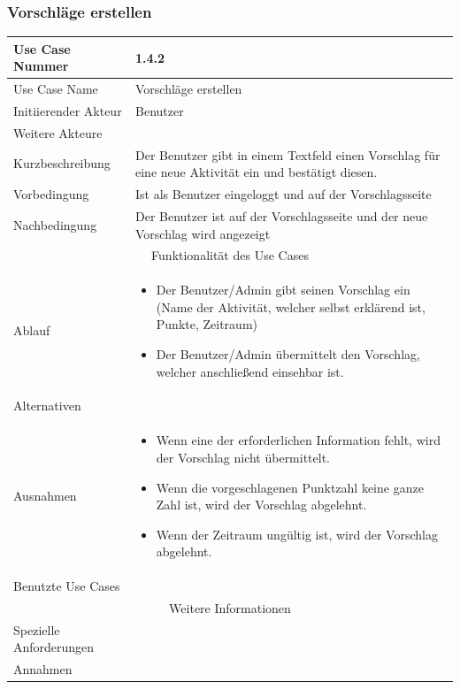 \documentclass[10pt,a4paper]{article}
\begin{document}
	\subsubsection{Vorschl\"age erstellen}
	\begin{tabular}{|l|p{.5\linewidth}|}
		\hline Use Case Nummer & 1.4.2 \\ 
		\hline Use Case Name & Vorschl\"age erstellen \\ 
		\hline Initiierender Akteur & Benutzer \\
		\hline Weitere Akteure & \\
		\hline Kurzbeschreibung & Der Benutzer gibt in einem Textfeld einen Vorschlag für eine neue Aktivit\"at ein und bestätigt diesen. \\
		\hline Vorbedingung & Ist als Benutzer eingeloggt und auf der Vorschlagsseite \\
		\hline Nachbedingung & Der Benutzer ist auf der Vorschlagsseite und der neue Vorschlag wird angezeigt \\
		\hline \multicolumn{2}{|c|}{Funktionalität des Use Cases}\\
		\hline Ablauf & \begin{itemize}
			\item Der Benutzer/Admin gibt seinen Vorschlag ein (Name der Aktivität, welcher selbst erklärend ist, Punkte, Zeitraum)
			\item Der Benutzer/Admin \"ubermittelt den Vorschlag, welcher anschließend einsehbar ist.
		\end{itemize} \\
		\hline Alternativen &  \\
		\hline Ausnahmen & \begin{itemize}
			\item Wenn eine der erforderlichen Information fehlt, wird der Vorschlag nicht \"ubermittelt.
			\item Wenn die vorgeschlagenen Punktzahl keine ganze Zahl ist, wird der Vorschlag abgelehnt.
			\item Wenn der Zeitraum ungültig ist, wird der Vorschlag abgelehnt.
		\end{itemize} \\
		\hline Benutzte Use Cases &  \\
		\hline \multicolumn{2}{|c|}{Weitere Informationen} \\
		\hline Spezielle Anforderungen &  \\
		\hline Annahmen &  \\
		\hline
	\end{tabular}
        
\end{document}
